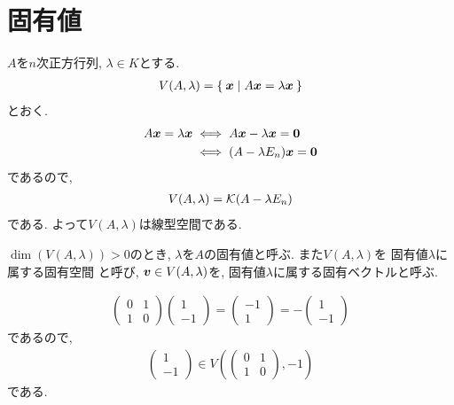 \section{固有値}
$A$を$n$次正方行列,
$\lambda\in K$とする.
\begin{align*}
  V(A,\lambda)=\Set{\boldsymbol{x}|A\boldsymbol{x}=\lambda\boldsymbol{x}}
\end{align*}
とおく.
\begin{align*}
  A\boldsymbol{x}=\lambda\boldsymbol{x}
  &\iff A\boldsymbol{x}-\lambda\boldsymbol{x}=\boldsymbol{0}\\
  &\iff (A-\lambda E_n)\boldsymbol{x}=\boldsymbol{0}\\
\end{align*}
であるので,
\begin{align*}
  V(A,\lambda)=\mathcal{K}(A-\lambda E_n)
\end{align*}
である.
よって$V(A,\lambda)$は線型空間である.
\begin{definition}
$\dim(V(A,\lambda))>0$のとき,
$\lambda$を$A$の固有値と呼ぶ.
  また$V(A,\lambda)$を
  固有値$\lambda$に属する固有空間
  と呼び,
  $\boldsymbol{v}\in V(A,\lambda)$を,
  固有値$\lambda$に属する固有ベクトルと呼ぶ.
\end{definition}
\begin{example}
  \begin{align*}
    \begin{pmatrix}0&1\\1&0\end{pmatrix}
      \begin{pmatrix}1\\-1\end{pmatrix}
        =
      \begin{pmatrix}-1\\1\end{pmatrix}
        =
      -\begin{pmatrix}1\\-1\end{pmatrix}
  \end{align*}
  であるので,
  \begin{align*}
    \begin{pmatrix}1\\-1\end{pmatrix}
      \in
      V(\begin{pmatrix}0&1\\1&0\end{pmatrix},-1)
  \end{align*}
  である.
\end{example}
